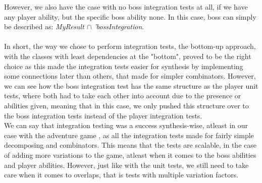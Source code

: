 However, we also have the case with no boss integration tests at all, if we have any player ability, but the specific boss ability none. In this case, boss can simply be described as: \textit{MyResult $\cap$ 'bossIntegration}. \\
\\
In short, the way we chose to perform integration tests, the bottom-up approach, with the classes with least dependencies at the "bottom", proved to be the right choice as this made the integration tests easier for synthesis by implementing some connections later than others, that made for simpler combinators. However, we can see how the boss integration test has the same structure as the player unit tests, where both had to take each other into account due to the presence or abilities given, meaning that in this case, we only pushed this structure over to the boss integration tests instead of the player integration tests. \\
We can say that integration testing was a success synthesis-wise, atleast in our case with the adventure game , as all the integration tests made for fairly simple decomposing and combinators. This means that the tests are scalable, in the case of adding more variations to the game, atleast when it comes to the boss abilities and player abilities. However, just like with the unit tests, we still need to take care when it comes to overlaps, that is tests with multiple variation factors.
